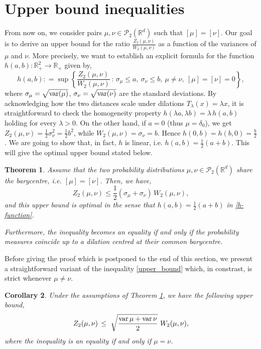 \documentclass[11pt,reqno]{amsart}
\newtheorem{theorem}{Theorem}[section]
\newtheorem{corollary}[theorem]{Corollary}
\theoremstyle{definition}
\numberwithin{equation}{section}
\newcommand{\R}{\mathbb{R}}
\newcommand{\Rd}{{\R^d}}
\newcommand{\var}{{\rm{var}}}
\begin{document}
\vskip1cm

\section{Upper bound inequalities}

From now on, we consider pairs $\mu,\nu \in \mathcal{P}_2(\Rd)$ such that $[\mu] = [\nu]$. Our goal is to derive an upper bound for the ratio $\frac{ Z_2(\mu,\nu)}{ W_2(\mu,\nu)}$
as a function of the variances of $\mu$ and $\nu$. More precisely, we want to establish an explicit formula for the function $h(a,b): \R_+^2 \to \R_+$ given by,
\begin{equation}\label{h-function}
h(a,b) : = \sup  \left\{ \frac{ Z_2(\mu,\nu)}{ W_2(\mu,\nu)} \, :\,   \sigma_\mu \le a, \ \sigma_\nu\le b, \ \mu \neq \nu , \  [\mu]=[\nu]=0 \right\},
\end{equation}
where $\sigma_\mu = \sqrt{\var(\mu)}$, $\sigma_\nu = \sqrt{\var(\nu)}$ are the standard deviations.
 By acknowledging how the two distances scale under dilations $T_\lambda(x) =\lambda x$, it is straightforward to check the homogeneity property  $h(\lambda a, \lambda b) = \lambda \, h(a,b)$ holding for every $\lambda>0$.
On the other hand, if $a=0$ (thus $\mu=\delta_0$), we get $Z_2(\mu,\nu) = \frac1{2} \sigma_\nu^2 = \frac1{2} b^2$, while $W_2(\mu,\nu)= \sigma_\nu =  b$. Hence $h(0,b)=h(b,0)= \frac{b}{2}$.
We are going to show that,  in fact, $h$ is linear, i.e. $h(a,b)= \frac1{2} (a+b)$. This will give the optimal upper bound stated below.
  

\begin{theorem}
	\label{thm_upper}
	Assume that the two probability distributions $\mu,\nu \in \mathcal{P}_2(\Rd)$ share the barycentre, i.e. $[\mu] = [\nu]$. Then, we have,
	\begin{equation}
		\label{upper_bound}
		 Z_2(\mu,\nu)  \leq \frac{1}{2}  (\sigma_\mu + \sigma_\nu)\, W_2(\mu,\nu) ,
	\end{equation}
	and this upper bound is optimal in the sense that  $h(a,b)= \frac1{2}(a+b)$ in \eqref{h-function}.
	
	Furthermore, the inequality becomes an equality if and only if  the probability measures coincide up to a dilation centred at their common barycentre.
\end{theorem}

Before giving the proof which is postponed to the end of this section, we present a  straightforward variant of the inequality \eqref{upper_bound}
which, in constrast, is strict whenever $\mu\not=\nu$.
\begin{corollary}\label{variant_upper}  Under the assumptions of Theorem \ref{thm_upper}, we have the following upper bound,
\begin{equation}
		\label{varupper}
		 Z_2(\mu,\nu) \, \leq \ \sqrt{\frac{\var\, \mu + \var\, \nu}{2}}\ W_2(\mu,\nu) ,
	\end{equation}
where the inequality is an equality if and only if $\mu=\nu$. 
\end{corollary}
\end{document}
